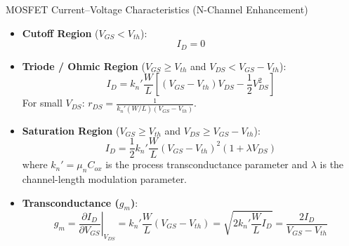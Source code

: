 \begin{formulabox}{MOSFET Current--Voltage Characteristics (N-Channel Enhancement)}
\begin{itemize}[leftmargin=1.5em]
    \item \textbf{Cutoff Region} ($V_{GS} < V_{th}$):
    \[ I_D = 0 \]
    \item \textbf{Triode / Ohmic Region} ($V_{GS} \ge V_{th}$ and $V_{DS} < V_{GS} - V_{th}$):
    \[ I_D = k_n' \frac{W}{L} \left[ (V_{GS} - V_{th})V_{DS} - \frac{1}{2}V_{DS}^2 \right] \]
    For small $V_{DS}$: $r_{DS} = \frac{1}{k_n' (W/L)(V_{GS} - V_{th})}$.
    \item \textbf{Saturation Region} ($V_{GS} \ge V_{th}$ and $V_{DS} \ge V_{GS} - V_{th}$):
    \[ I_D = \frac{1}{2} k_n' \frac{W}{L} (V_{GS} - V_{th})^2 (1 + \lambda V_{DS}) \]
    where $k_n' = \mu_n C_{ox}$ is the process transconductance parameter and $\lambda$ is the channel-length modulation parameter.
    \item \textbf{Transconductance ($g_m$)}:
    \[ g_m = \left.\frac{\partial I_D}{\partial V_{GS}}\right|_{V_{DS}} = k_n' \frac{W}{L}(V_{GS} - V_{th}) = \sqrt{2 k_n' \frac{W}{L} I_D} = \frac{2 I_D}{V_{GS} - V_{th}} \]
\end{itemize}
\end{formulabox}
